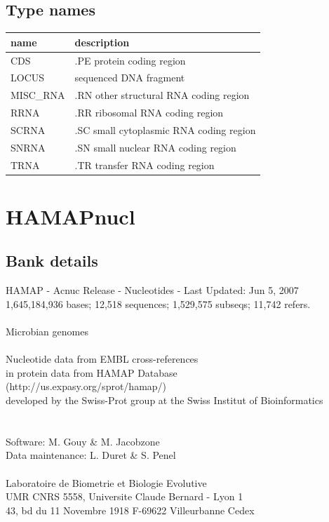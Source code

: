 \documentclass{article}
\begin{document}
\begin{Schunk}
\subsection{Type names}
\noindent\begin{tabular}{ll}
\hline \hline
name & description\\
\hline
CDS & .PE protein coding region \\
LOCUS & sequenced DNA fragment \\
MISC\_RNA & .RN other structural RNA coding region \\
RRNA & .RR ribosomal RNA coding region \\
SCRNA & .SC small cytoplasmic RNA coding region \\
SNRNA & .SN small nuclear RNA coding region \\
TRNA & .TR transfer RNA coding region \\
\hline \hline
\end{tabular}

\section{ HAMAPnucl }
\subsection{Bank details}
HAMAP - Acnuc Release - Nucleotides - Last Updated: Jun  5, 2007\\
1,645,184,936 bases; 12,518 sequences; 1,529,575 subseqs; 11,742 refers.\\
	\\
Microbian genomes\\
\\
Nucleotide data from  EMBL cross-references		\\
in protein data from  HAMAP Database\\
(http://us.expasy.org/sprot/hamap/)\\
developed by the Swiss-Prot group at the Swiss Institut of Bioinformatics\\
\\
\\
Software: M. Gouy \& M. Jacobzone\\
Data maintenance: L. Duret \& S. Penel\\
\\
Laboratoire de Biometrie et Biologie Evolutive\\
UMR CNRS 5558, Universite Claude Bernard - Lyon 1\\
43, bd du 11 Novembre 1918 F-69622 Villeurbanne Cedex\\



\end{Schunk}
\end{document}
